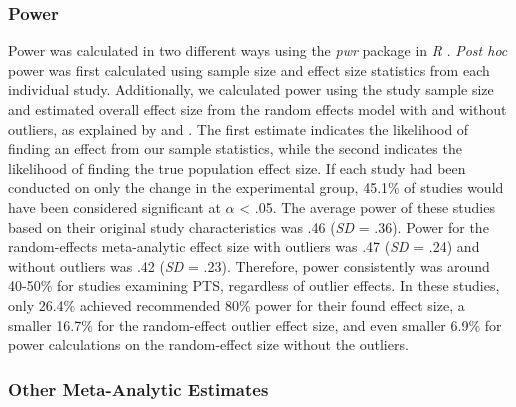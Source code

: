 \documentclass[english,man]{apa6}
\theoremstyle{definition}
\theoremstyle{definition}
\theoremstyle{definition}
\theoremstyle{remark}
\begin{document}
\subsubsection{Power}\label{power}

Power was calculated in two different ways using the \emph{pwr} package
in \emph{R} \autocite{Champely2016}. \emph{Post hoc} power was first
calculated using sample size and effect size statistics from each
individual study. Additionally, we calculated power using the study
sample size and estimated overall effect size from the random effects
model with and without outliers, as explained by \textcite{Francis2012}
and \textcite{Francis2014}. The first estimate indicates the likelihood
of finding an effect from our sample statistics, while the second
indicates the likelihood of finding the true population effect size. If
each study had been conducted on only the change in the experimental
group, 45.1\% of studies would have been considered significant at
\(\alpha\) \textless{} .05. The average power of these studies based on
their original study characteristics was .46 (\emph{SD} = .36). Power
for the random-effects meta-analytic effect size with outliers was .47
(\emph{SD} = .24) and without outliers was .42 (\emph{SD} = .23).
Therefore, power consistently was around 40-50\% for studies examining
PTS, regardless of outlier effects. In these studies, only 26.4\%
achieved recommended 80\% power for their found effect size, a smaller
16.7\% for the random-effect outlier effect size, and even smaller 6.9\%
for power calculations on the random-effect size without the outliers.

\subsubsection{Other Meta-Analytic
Estimates}\label{other-meta-analytic-estimates}
\end{document}
